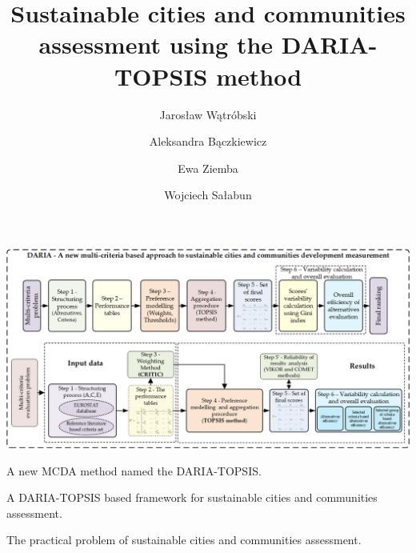 \documentclass[5p,times]{elsarticle}
\begin{document}
\begin{frontmatter}

\title{Sustainable cities and communities assessment using the DARIA-TOPSIS method}



\onecolumn
\begin{graphicalabstract}
\includegraphics[width=\linewidth]{SCSabs_graficzny_nowy.png}
\end{graphicalabstract}

\begin{highlights}
\item A new MCDA method named the DARIA-TOPSIS.
\item A DARIA-TOPSIS based framework for sustainable cities and communities assessment.
\item The practical problem of sustainable cities and communities assessment.
\end{highlights}

\author[1]{Jarosław Wątróbski}

\author[1,2]{Aleksandra Bączkiewicz}

\author[3]{Ewa Ziemba}

\author[4]{Wojciech Sałabun}


\address[1]{Institute of Management, University of Szczecin, ul. Cukrowa 8, 71-004 Szczecin, Poland}
\address[2]{Doctoral School of University of Szczecin, ul. Mickiewicza 16, 70-383 Szczecin, Poland}
\address[3]{Department of Business Informatics and International Accounting, Faculty of Finance and Insurance, University of Economics in Katowice, ul. 1 Maja 50, 40-287 Katowice, Poland}
\address[4]{National Institute of Telecommunications, Szachowa 1, 04-894 Warsaw, Poland}


\end{frontmatter}
\end{document}
